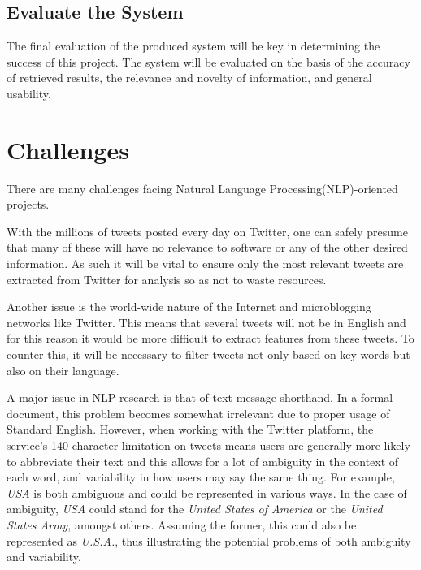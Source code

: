 \subsection{Evaluate the System}
The final evaluation of the produced system will be key in determining the success of this project. The system will be evaluated on the basis of the accuracy of retrieved results, the relevance and novelty of information, and general usability.

\section{Challenges}
There are many challenges facing Natural Language Processing(NLP)-oriented projects.

With the millions of tweets posted every day on Twitter, one can safely presume that many of these will have no relevance to software or any of the other desired information. As such it will be vital to ensure only the most relevant tweets are extracted from Twitter for analysis so as not to waste resources.

Another issue is the world-wide nature of the Internet and microblogging networks like Twitter. This means that several tweets will not be in English and for this reason it would be more difficult to extract features from these tweets. To counter this, it will be necessary to filter tweets not only based on key words but also on their language.

A major issue in NLP research is that of text message shorthand. In a formal document, this problem becomes somewhat irrelevant due to proper usage of Standard English. However, when working with the Twitter platform, the service's 140 character limitation on tweets means users are generally more likely to abbreviate their text and this allows for a lot of ambiguity in the context of each word, and variability in how users may say the same thing. For example, \emph{USA} is both ambiguous and could be represented in various ways. In the case of ambiguity, \emph{USA} could stand for the \emph{United States of America} or the \emph{United States Army}, amongst others. Assuming the former, this could also be represented as \emph{U.S.A.}, thus illustrating the potential problems of both ambiguity and variability.

